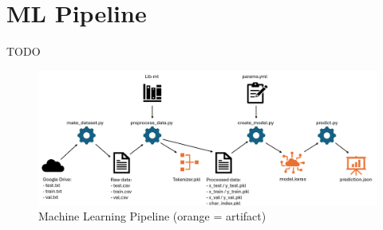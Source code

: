 
\section{ML Pipeline}
TODO

\begin{figure}
    \centering
    \includegraphics[width=0.75\linewidth]{images/ml_pipeline.png}
    \caption{Machine Learning Pipeline (orange = artifact)}
    \label{fig:ml-pipeline}
\end{figure}